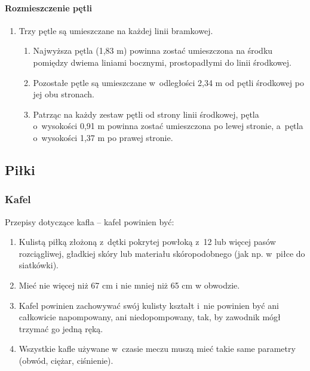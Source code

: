 \documentclass[12pt,a4paper]{article}
\begin{document}
\paragraph{Rozmieszczenie pętli}
\begin{enumerate}
	\item Trzy pętle są umieszczane na każdej linii bramkowej.
	      \begin{enumerate}
		      \item Najwyższa pętla (1,83 m) powinna zostać umieszczona na środku
		            pomiędzy dwiema liniami bocznymi, prostopadłymi do linii środkowej.

		      \item Pozostałe pętle są umieszczane w~odległości 2,34 m od pętli
		            środkowej po jej obu stronach.

		      \item Patrząc na każdy zestaw pętli od strony linii środkowej, pętla o~wysokości 0,91 m powinna zostać umieszczona po lewej stronie, a~pętla o~wysokości 1,37 m po prawej stronie.
	      \end{enumerate}
\end{enumerate}

\subsection{Piłki}

\subsubsection{Kafel}
Przepisy dotyczące kafla -- kafel powinien być:

\begin{enumerate}
	\item Kulistą piłką złożoną z~dętki pokrytej powłoką z~12 lub więcej pasów
	      rozciągliwej, gładkiej skóry lub materiału skóropodobnego (jak np. w~piłce do siatkówki).

	\item Mieć nie więcej niż 67 cm i nie mniej niż 65 cm w obwodzie.

	\item Kafel powinien zachowywać swój kulisty kształt i~nie powinien być ani
	      całkowicie napompowany, ani niedopompowany, tak, by zawodnik mógł
	      trzymać go jedną ręką.

	\item Wszystkie kafle używane w~czasie meczu muszą mieć takie same
	      parametry (obwód, ciężar, ciśnienie).
\end{enumerate}
\end{document}

